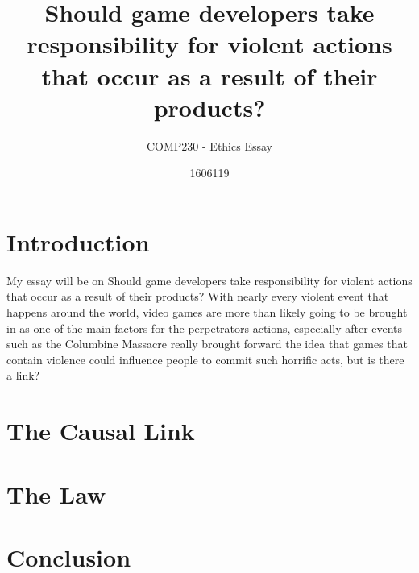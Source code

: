 \documentclass{scrartcl}
\title{Should game developers take responsibility for violent actions that occur as a result of their products?}
\subtitle{COMP230 - Ethics Essay}
\author{1606119}
\begin{document}
\maketitle

\abstract{} 

\section{Introduction}
My essay will be on Should game developers take responsibility for violent actions that occur as a result of their products? With nearly every violent event that happens around the world, video games are more than likely going to be brought in as one of the main factors for the perpetrators actions, especially after events such as the Columbine Massacre really brought forward the idea that games that contain violence could influence people to commit such horrific acts, but is there a link? 

\section{The Causal Link}



\section{The Law}



\section{Conclusion}










\end{document}
